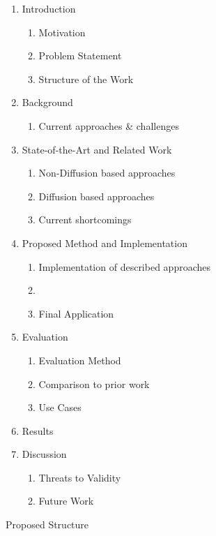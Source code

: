 \documentclass[10pt,a4paper]{scrartcl} %
\begin{document}
\begin{figure}[h]
		\caption{Proposed Structure}
	\begin{enumerate}[label*=\arabic*.]
		\item Introduction
		\begin{enumerate}[label*=\arabic*]
			\item Motivation
			\item Problem Statement
			\item Structure of the Work
		\end{enumerate}
		\item Background
		\begin{enumerate}[label*=\arabic*]
      \item Current approaches \& challenges
		\end{enumerate}
		\item State-of-the-Art and Related Work
		\begin{enumerate}[label*=\arabic*]
      \item Non-Diffusion based approaches
			\item Diffusion based approaches
			\item Current shortcomings
		\end{enumerate}
		\item Proposed Method and Implementation
		\begin{enumerate}[label*=\arabic*]
      \item Implementation of described approaches
      \item 
      \item Final Application
		\end{enumerate}	
		\item Evaluation
		\begin{enumerate}[label*=\arabic*]
			\item Evaluation Method
			\item Comparison to prior work
			\item Use Cases
		\end{enumerate}
		\item Results
		\item Discussion
		\begin{enumerate}[label*=\arabic*]
			\item Threats to Validity
			\item Future Work
		\end{enumerate}
		
		
	\end{enumerate}
	\label{fig:Structure}
\end{figure}


\pagebreak


\end{document}
